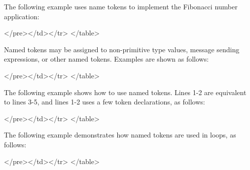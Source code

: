 The following example uses name tokens to implement the Fibonacci number application:
{\singlespace

}
\begin{htmlonly}

 \begin{rawhtml} 
   </pre></td></tr>
  </table>
\end{rawhtml} 
\end{htmlonly}
 

Named tokens may be assigned to non-primitive type values, 
message sending expressions, or other named tokens. 
Examples are shown as follows:
{\singlespace

}
\begin{htmlonly}

 \begin{rawhtml} 
   </pre></td></tr>
  </table>
\end{rawhtml} 
\end{htmlonly}

The following example shows how to use named tokens.
Lines 1-2 are equivalent to lines 3-5, and
lines 1-2 uses a few token declarations, as follows: 
{\singlespace

}
\begin{htmlonly}

 \begin{rawhtml} 
   </pre></td></tr>
  </table>
\end{rawhtml} 
\end{htmlonly}

The following example demonstrates how named tokens are used in loops, as follows:
{\singlespace

}
\begin{htmlonly}

 \begin{rawhtml} 
   </pre></td></tr>
  </table>
\end{rawhtml} 
\end{htmlonly}

